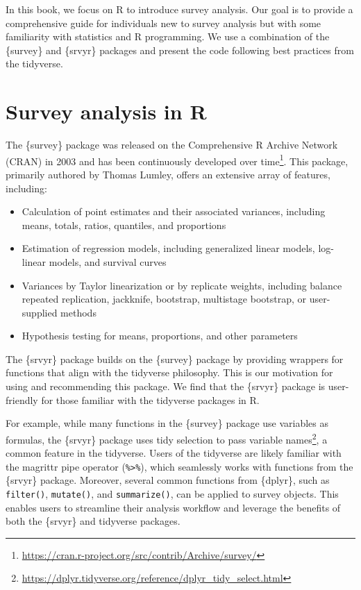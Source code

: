\documentclass[
]{krantz}
\providecommand{\tightlist}{%
  \setlength{\itemsep}{0pt}\setlength{\parskip}{0pt}}
\begin{document}
In this book, we focus on R to introduce survey analysis. Our goal is to provide a comprehensive guide for individuals new to survey analysis but with some familiarity with statistics and R programming. We use a combination of the \{survey\} and \{srvyr\} packages and present the code following best practices from the tidyverse.

\hypertarget{survey-analysis-in-r}{%
\section{Survey analysis in R}\label{survey-analysis-in-r}}

The \{survey\} package was released on the Comprehensive R Archive Network (CRAN) in 2003 and has been continuously developed over time\footnote{\url{https://cran.r-project.org/src/contrib/Archive/survey/}}. This package, primarily authored by Thomas Lumley, offers an extensive array of features, including:

\begin{itemize}
\tightlist
\item
  Calculation of point estimates and their associated variances, including means, totals, ratios, quantiles, and proportions
\item
  Estimation of regression models, including generalized linear models, log-linear models, and survival curves
\item
  Variances by Taylor linearization or by replicate weights, including balance repeated replication, jackknife, bootstrap, multistage bootstrap, or user-supplied methods
\item
  Hypothesis testing for means, proportions, and other parameters
\end{itemize}

The \{srvyr\} package builds on the \{survey\} package by providing wrappers for functions that align with the tidyverse philosophy. This is our motivation for using and recommending this package. We find that the \{srvyr\} package is user-friendly for those familiar with the tidyverse packages in R.

For example, while many functions in the \{survey\} package use variables as formulas, the \{srvyr\} package uses tidy selection to pass variable names\footnote{\url{https://dplyr.tidyverse.org/reference/dplyr_tidy_select.html}}, a common feature in the tidyverse. Users of the tidyverse are likely familiar with the magrittr pipe operator (\texttt{\%\textgreater{}\%}), which seamlessly works with functions from the \{srvyr\} package. Moreover, several common functions from \{dplyr\}, such as \texttt{filter()}, \texttt{mutate()}, and \texttt{summarize()}, can be applied to survey objects. This enables users to streamline their analysis workflow and leverage the benefits of both the \{srvyr\} and tidyverse packages.
\end{document}
